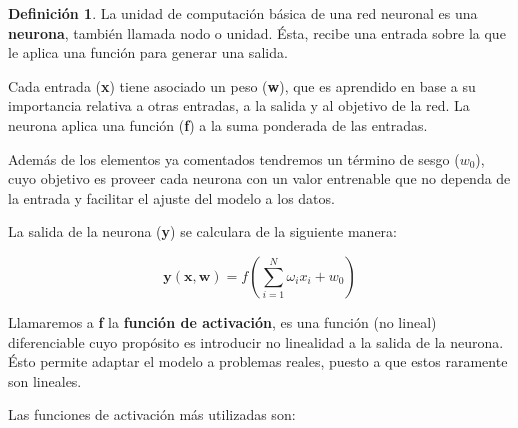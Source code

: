\documentclass[12,twoside]{TFG-GM}
\theoremstyle{definition}
\newtheorem{definition}[theorem]{Definición}
\theoremstyle{remark}
\begin{document}
\begin{definition} 
La unidad de computación básica de una red neuronal es una \textbf{neurona}, también llamada nodo o unidad. Ésta, recibe una entrada sobre la que le aplica una función para generar una salida.
\end{definition}
Cada entrada (\textbf{x}) tiene asociado un peso (\textbf{w}), que es aprendido en base a su importancia relativa a otras entradas, a la salida y al objetivo de la red. La neurona  aplica una función (\textbf{f}) a la suma ponderada de las entradas. 

Además de los elementos ya comentados tendremos un término de sesgo ($w_0$), cuyo objetivo es proveer cada neurona con un valor entrenable que no dependa de la entrada y facilitar el ajuste del modelo a los datos. 

La salida de la neurona (\textbf{y}) se calculara de la siguiente manera: 

$$
\mathbf{y}(\mathbf{x},\mathbf{w}) = f \left(\sum_{i=1}^N \omega_i x_i + w_0 \right) 
$$

Llamaremos a \textbf{f} la \textbf{función de activación}, es una función (no lineal) diferenciable cuyo propósito es introducir no linealidad a la salida de la neurona. Ésto permite adaptar el modelo a problemas reales, puesto a que estos raramente son lineales. 

Las funciones de activación más utilizadas son: 
\end{document}
